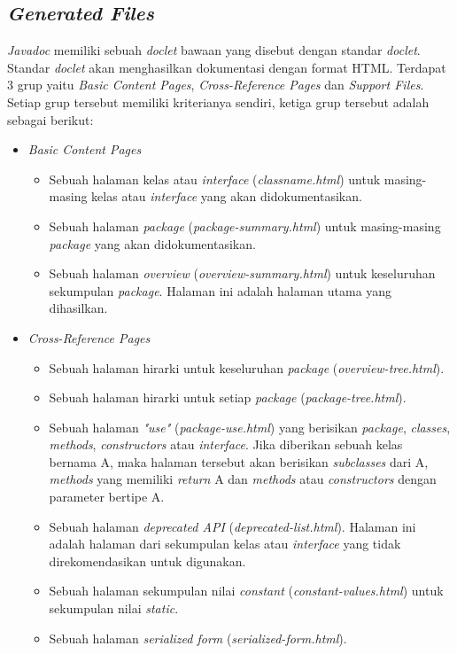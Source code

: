 \subsection{\textit{Generated Files}}
\label{sec:generated-files}
{\it Javadoc} memiliki sebuah {\it doclet} bawaan yang disebut dengan standar {\it doclet}. Standar {\it doclet} akan menghasilkan dokumentasi dengan format HTML. Terdapat 3 grup yaitu {\it Basic Content Pages}, {\it Cross-Reference Pages} dan {\it Support Files}. Setiap grup tersebut memiliki kriterianya sendiri, ketiga grup tersebut adalah sebagai berikut:
\begin{itemize}
	\item {\it Basic Content Pages}
	\begin{itemize}
		\item Sebuah halaman kelas atau {\it interface} ({\it classname.html}) untuk masing-masing kelas atau {\it interface} yang akan didokumentasikan.
		\item Sebuah halaman {\it package} ({\it package-summary.html}) untuk masing-masing {\it package} yang akan didokumentasikan.
		\item Sebuah halaman {\it overview} ({\it overview-summary.html}) untuk keseluruhan sekumpulan {\it package}. Halaman ini adalah halaman utama yang dihasilkan.
	\end{itemize}
	\item {\it Cross-Reference Pages}
	\begin{itemize}
		\item Sebuah halaman hirarki untuk keseluruhan {\it package} ({\it overview-tree.html}).
		\item Sebuah halaman hirarki untuk setiap {\it package} ({\it package-tree.html}).
		\item Sebuah halaman {\it "use"} ({\it package-use.html}) yang berisikan {\it package}, {\it classes}, {\it methods}, {\it constructors} atau {\it interface}. Jika diberikan sebuah kelas bernama A, maka halaman tersebut akan berisikan {\it subclasses} dari A, {\it methods} yang memiliki {\it return} A dan {\it methods} atau {\it constructors} dengan parameter bertipe A.
		\item Sebuah halaman {\it deprecated API} ({\it deprecated-list.html}). Halaman ini adalah halaman dari sekumpulan kelas atau {\it interface} yang tidak direkomendasikan untuk digunakan.
		\item Sebuah halaman sekumpulan nilai {\it constant} ({\it constant-values.html}) untuk sekumpulan nilai {\it static}.
		\item Sebuah halaman {\it serialized form} ({\it serialized-form.html}).

\end{itemize}
\end{itemize}
